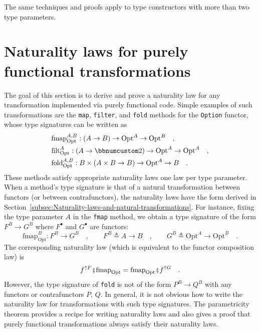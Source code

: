 The same techniques and proofs apply to type constructors with more
than two type parameters.

\section{Naturality laws for purely functional transformations\label{sec:Naturality-laws-for-fully-parametric-functions}}

The goal of this section is to derive and prove a naturality law for
any transformation implemented via purely functional code. Simple
examples of such transformations are the \lstinline!map!, \lstinline!filter!,
and \lstinline!fold! methods for the \lstinline!Option! functor,
whose type signatures can be written as
\begin{align*}
 & \text{fmap}_{\text{Opt}}^{A,B}:\left(A\rightarrow B\right)\rightarrow\text{Opt}^{A}\rightarrow\text{Opt}^{B}\quad,\\
 & \text{filt}_{\text{Opt}}^{A}:\left(A\rightarrow\bbnum 2\right)\rightarrow\text{Opt}^{A}\rightarrow\text{Opt}^{A}\quad,\\
 & \text{fold}_{\text{Opt}}^{A,B}:B\times\left(A\times B\rightarrow B\right)\rightarrow\text{Opt}^{A}\rightarrow B\quad.
\end{align*}
These methods satisfy appropriate naturality laws \textemdash{} one
law per type parameter. When a method\textsf{'}s type signature is that of
a natural transformation between functors (or between contrafunctors),
the naturality laws have the form derived in Section~\ref{subsec:Naturality-laws-and-natural-transformations}.
For instance, fixing the type parameter $A$ in the \lstinline!fmap!
method, we obtain a type signature of the form $F^{B}\rightarrow G^{B}$
where $F^{\bullet}$ and $G^{\bullet}$ are functors:
\[
\text{fmap}_{\text{Opt}}^{B}:F^{B}\rightarrow G^{B}\quad,\quad\quad F^{B}\triangleq A\rightarrow B\quad,\quad\quad G^{B}\triangleq\text{Opt}^{A}\rightarrow\text{Opt}^{B}\quad.
\]
The corresponding naturality law (which is equivalent to the functor
composition law) is
\[
f^{\uparrow F}\bef\text{fmap}_{\text{Opt}}=\text{fmap}_{\text{Opt}}\bef f^{\uparrow G}\quad.
\]
However, the type signature of \lstinline!fold! is not of the form
$P^{B}\rightarrow Q^{B}$ with any functors or contrafunctors $P$,
$Q$. In general, it is not obvious how to write the naturality law
for transformations with such type signatures. The parametricity theorem
provides a recipe for writing naturality laws and also gives a proof
that purely functional transformations always satisfy their naturality
laws.


